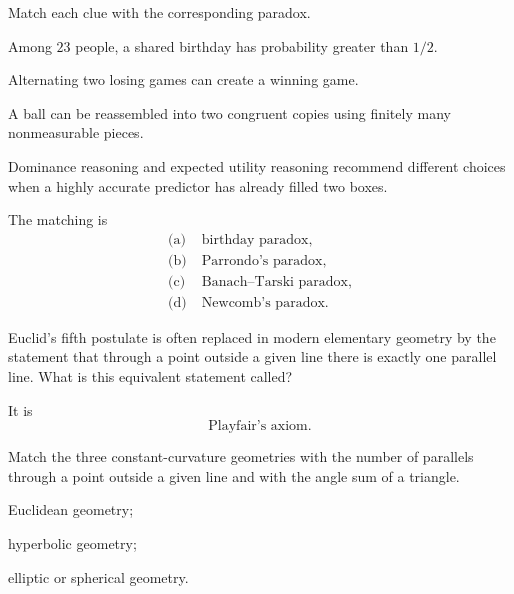     \begin{expectedproblem}
        Match each clue with the corresponding paradox.
        \begin{problemsubparts}
            \item Among $23$ people, a shared birthday has probability greater
                  than $1/2$.
            \item Alternating two losing games can create a winning game.
            \item A ball can be reassembled into two congruent copies using
                  finitely many nonmeasurable pieces.
            \item Dominance reasoning and expected utility reasoning recommend
                  different choices when a highly accurate predictor has already
                  filled two boxes.
        \end{problemsubparts}
    \end{expectedproblem}

    \begin{solution}
        The matching is
        \[
            \boxed{
                \begin{aligned}
                    \text{(a)}\;&\text{birthday paradox},\\
                    \text{(b)}\;&\text{Parrondo's paradox},\\
                    \text{(c)}\;&\text{Banach--Tarski paradox},\\
                    \text{(d)}\;&\text{Newcomb's paradox}.
                \end{aligned}
            }
        \]
    \end{solution}

    \begin{expectedproblem}
        Euclid's fifth postulate is often replaced in modern elementary
        geometry by the statement that through a point outside a given line
        there is exactly one parallel line. What is this equivalent statement
        called?
    \end{expectedproblem}

    \begin{solution}
        It is
        \[
            \boxed{\text{Playfair's axiom}}.
        \]
    \end{solution}

    \begin{expectedproblem}
        Match the three constant-curvature geometries with the number of
        parallels through a point outside a given line and with the angle sum of
        a triangle.
        \begin{problemsubparts}
            \item Euclidean geometry;
            \item hyperbolic geometry;
            \item elliptic or spherical geometry.
        \end{problemsubparts}
    \end{expectedproblem}

